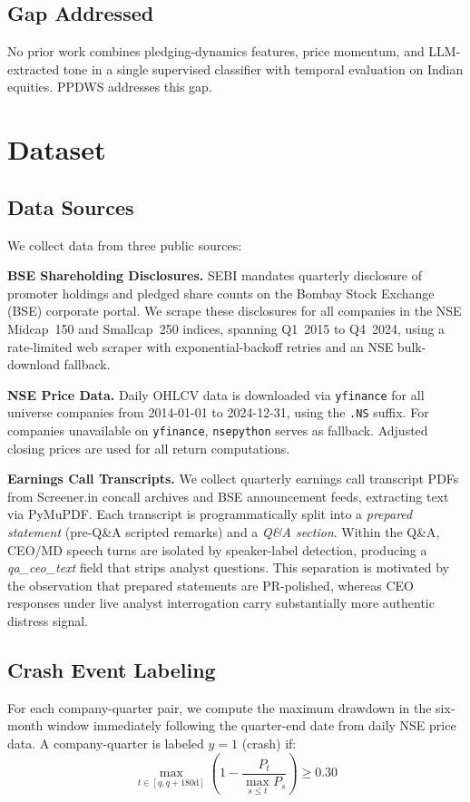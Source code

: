 \documentclass[conference]{IEEEtran}
\begin{document}
\subsection{Gap Addressed}
No prior work combines pledging-dynamics features, price momentum, and
LLM-extracted tone in a single supervised classifier with temporal
evaluation on Indian equities. PPDWS addresses this gap.

\section{Dataset}

\subsection{Data Sources}
We collect data from three public sources:

\textbf{BSE Shareholding Disclosures.} SEBI mandates quarterly disclosure
of promoter holdings and pledged share counts on the Bombay Stock Exchange
(BSE) corporate portal. We scrape these disclosures for all companies in
the NSE Midcap~150 and Smallcap~250 indices, spanning Q1~2015 to
Q4~2024, using a rate-limited web scraper with exponential-backoff
retries and an NSE bulk-download fallback.

\textbf{NSE Price Data.} Daily OHLCV data is downloaded via
\texttt{yfinance} for all universe companies from 2014-01-01 to
2024-12-31, using the \texttt{.NS} suffix. For companies unavailable on
\texttt{yfinance}, \texttt{nsepython} serves as fallback. Adjusted
closing prices are used for all return computations.

\textbf{Earnings Call Transcripts.} We collect quarterly earnings call
transcript PDFs from Screener.in concall archives and BSE announcement
feeds, extracting text via PyMuPDF. Each transcript is programmatically
split into a \textit{prepared statement} (pre-Q\&A scripted remarks) and
a \textit{Q\&A section}. Within the Q\&A, CEO/MD speech turns are
isolated by speaker-label detection, producing a \textit{qa\_ceo\_text}
field that strips analyst questions. This separation is motivated by the
observation that prepared statements are PR-polished, whereas CEO
responses under live analyst interrogation carry substantially more
authentic distress signal.

\subsection{Crash Event Labeling}
For each company-quarter pair, we compute the maximum drawdown in the
six-month window immediately following the quarter-end date from daily
NSE price data. A company-quarter is labeled $y = 1$ (crash) if:
\begin{equation}
  \max_{t \in [q, q+180\text{d}]} \left(1 - \frac{P_t}{\max_{s \leq t} P_s}\right) \geq 0.30
\end{equation}
\end{document}
